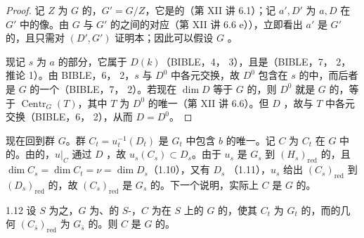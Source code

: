 \begin{proof}
记 $Z$ 为 $G$ 的，$G'=G/Z$，它是的（第 XII 讲 6.1）；记 $a',D'$ 为 $a,D$ 在 $G'$ 中的像。由 $G$ 与 $G'$ 的之间的对应（第 XII 讲 6.6 e）），立即看出 $a'$ 是 $G'$ 的，且只需对 $(D',G')$ 证明本；因此可以假设 $G$ 。

现记 $s$ 为 $a$ 的部分，它属于 $D(k)$（BIBLE，4， 3），且是（BIBLE，7， 2，推论 1）。由 BIBLE，6， 2，$s$ 与 $D^0$ 中各元交换，故 $D^0$ 包含在 $s$ 的中，而后者是 $G$ 的一个（BIBLE，7， 2）。若现在 $\dim D$ 等于 $G$ 的，则 $D^0$ 就是 $G$ 的，等于 $\operatorname{Centr}_G(T)$，其中 $T$ 为 $D^0$ 的唯一（第 XII 讲 6.6）。但 $D$ ，故与 $T$ 中各元交换（BIBLE，6， 2），从而 $D=D^0$。
\end{proof}
现在回到群 $G$。群 $C_t=u_t^{-1}(D_t)$ 是 $G_t$ 中包含 $b$ 的唯一。记 $C$ 为 $C_t$ 在 $G$ 中的。由的，$u|_C$ 通过 $D$ ，故 $u_s(C_s)\subset D_s$。由于 $u_s$ 是 $G_s$ 到 $(H_s)_{\mathrm{red}}$ 的，且
$\dim C_s=\dim C_t=\nu=\dim D_s$（1.10），又有 $D_s$ （1.11），$u_s$ 给出 $(C_s)_{\mathrm{red}}$ 到 $(D_s)_{\mathrm{red}}$ 的，故 $(C_s)_{\mathrm{red}}$ 是 $G_s$ 的。下一个说明，实际上 $C$ 是 $G$ 的。
\begin{SGAresult}{}{1.12}
设 $S$ 为之，$G$ 为、的 $S$-，$C$ 为在 $S$ 上的 $G$ 的，使其 $C_t$ 为 $G_t$ 的，而的几何 $(C_{\bar s})_{\mathrm{red}}$ 为 $G_{\bar s}$ 的。则 $C$ 是 $G$ 的。
\end{SGAresult}
